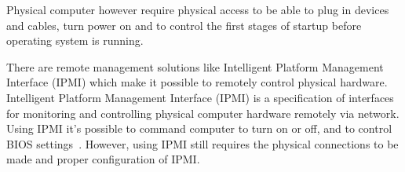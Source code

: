 Physical computer however require physical access to be able to plug
in devices and cables, turn power on and to control the first stages
of startup before operating system is running.

There are remote management solutions like Intelligent Platform
Management Interface (IPMI) which make it possible to remotely control
physical hardware. Intelligent Platform Management Interface (IPMI) is
a specification of interfaces for monitoring and controlling physical
computer hardware remotely via network. Using IPMI it's possible to
command computer to turn on or off, and to control BIOS
settings~\cite{ipmi-spec}. However, using IPMI still requires the
physical connections to be made and proper configuration of IPMI.

